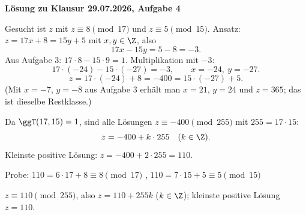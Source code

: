 \textbf{Lösung zu Klausur 29.07.2026, Aufgabe 4}

 Gesucht ist $z$ mit $z \equiv 8 \pmod{17}$ und $z \equiv 5 \pmod{15}$. Ansatz: $z = 17x + 8 = 15y + 5$ mit $x, y \in \Z$, also
\[
17x - 15y = 5 - 8 = -3 .
\]
Aus Aufgabe 3: $17 \cdot 8 - 15 \cdot 9 = 1$. Multiplikation mit $-3$:
\[
17 \cdot (-24) - 15 \cdot (-27) = -3, \qquad x = -24,\ y = -27 .
\]
\[
z = 17 \cdot (-24) + 8 = -400 = 15 \cdot (-27) + 5 .
\]
(Mit $x = -7$, $y = -8$ aus Aufgabe 3 erhält man $x = 21$, $y = 24$ und $z = 365$; das ist dieselbe Restklasse.)

 Da $\ggT(17, 15) = 1$, sind alle Lösungen $z \equiv -400 \pmod{255}$ mit $255 = 17 \cdot 15$:
\[
z = -400 + k \cdot 255 \quad (k \in \Z).
\]
Kleinste positive Lösung: $z = -400 + 2 \cdot 255 = 110$.

Probe: $110 = 6 \cdot 17 + 8 \equiv 8 \pmod{17}$ \checkmark, \quad $110 = 7 \cdot 15 + 5 \equiv 5 \pmod{15}$ \checkmark
\begin{ergebnis} $z \equiv 110 \pmod{255}$, also $z = 110 + 255k$ ($k \in \Z$); kleinste positive Lösung $z = 110$. \end{ergebnis}

